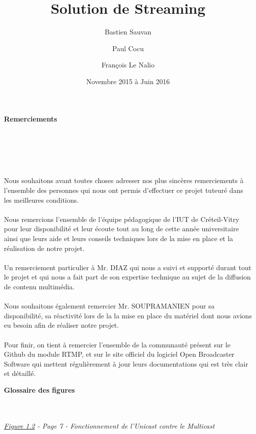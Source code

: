 \documentclass{report}
\title{Solution de Streaming}
\author{Bastien Sauvan \and Paul Cocu \and François Le Nalio}
\date{Novembre 2015 à Juin 2016}
\begin{document}
\maketitle





\begin{center}
\textbf{\Huge{Remerciements}}
\end{center}\\
\\
\\
\\
\hfill

Nous souhaitons avant toutes choses adresser nos plus sincères remerciements à l’ensemble des personnes qui nous ont permis d’effectuer ce projet tuteuré dans les meilleures conditions.
\\
\\
Nous remercions l’ensemble de l’équipe pédagogique de l’IUT de Créteil-Vitry pour leur disponibilité et leur écoute tout au long de cette année universitaire ainsi que leurs aide et leurs conseils techniques lors de la mise en place et la réalisation de notre projet.
\\
\\
Un remerciement particulier à Mr. DIAZ qui nous a suivi et supporté durant tout le projet et qui nous a fait part de son expertise technique au sujet de la diffusion de contenu multimédia.
\\
\\
Nous souhaitons également remercier Mr. SOUPRAMANIEN pour sa disponibilité, sa réactivité lors de la la mise en place du matériel dont nous avions eu besoin afin de réaliser notre projet.
\\
\\
Pour finir, on tient à remercier l'ensemble de la communauté présent sur le Github du module RTMP, et sur le site officiel du logiciel Open Broadcaster Software qui mettent régulièrement à jour leurs documentations qui est très clair et détaillé.  


\newpage

\begin{center}
\textbf{\Huge{Glossaire des figures}}
\end{center}\\

\hfill
\\



\textit{\underline{Figure 1.2} - Page 7 - Fonctionnement de l'Unicast contre le Multicast}
\\
\end{document}
